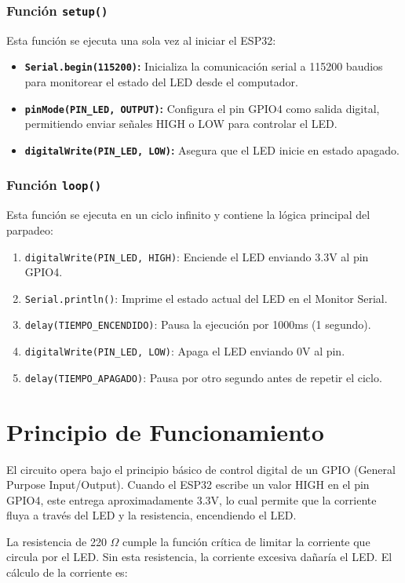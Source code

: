 \documentclass[12pt,a4paper]{article}
\begin{document}
\subsubsection*{Función \texttt{setup()}}
Esta función se ejecuta una sola vez al iniciar el ESP32:
\begin{itemize}
    \item \textbf{\texttt{Serial.begin(115200)}:} Inicializa la comunicación serial a 115200 baudios para monitorear el estado del LED desde el computador.
    \item \textbf{\texttt{pinMode(PIN\_LED, OUTPUT)}:} Configura el pin GPIO4 como salida digital, permitiendo enviar señales HIGH o LOW para controlar el LED.
    \item \textbf{\texttt{digitalWrite(PIN\_LED, LOW)}:} Asegura que el LED inicie en estado apagado.
\end{itemize}

\subsubsection*{Función \texttt{loop()}}
Esta función se ejecuta en un ciclo infinito y contiene la lógica principal del parpadeo:
\begin{enumerate}
    \item \texttt{digitalWrite(PIN\_LED, HIGH)}: Enciende el LED enviando 3.3V al pin GPIO4.
    \item \texttt{Serial.println()}: Imprime el estado actual del LED en el Monitor Serial.
    \item \texttt{delay(TIEMPO\_ENCENDIDO)}: Pausa la ejecución por 1000ms (1 segundo).
    \item \texttt{digitalWrite(PIN\_LED, LOW)}: Apaga el LED enviando 0V al pin.
    \item \texttt{delay(TIEMPO\_APAGADO)}: Pausa por otro segundo antes de repetir el ciclo.
\end{enumerate}

\section{Principio de Funcionamiento}
El circuito opera bajo el principio básico de control digital de un GPIO (General Purpose Input/Output). Cuando el ESP32 escribe un valor HIGH en el pin GPIO4, este entrega aproximadamente 3.3V, lo cual permite que la corriente fluya a través del LED y la resistencia, encendiendo el LED.

La resistencia de 220 $\Omega$ cumple la función crítica de limitar la corriente que circula por el LED. Sin esta resistencia, la corriente excesiva dañaría el LED. El cálculo de la corriente es:
\end{document}

